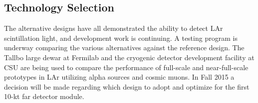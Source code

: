 \subsection{Technology Selection}

The alternative designs have all  demonstrated the ability to detect
LAr scintillation light, and development work is continuing. A testing program
is underway comparing the various alternatives against the reference
design.  The Tallbo large dewar at Fermilab and the cryogenic detector
development facility at CSU are being used to compare the performance
of full-scale and near-full-scale prototypes in LAr utilizing alpha
sources and cosmic muons. %
 In Fall 2015 a decision will be made regarding which design to adopt and optimize for the first 10-kt far detector module.

